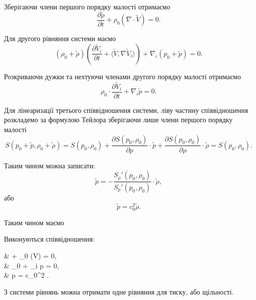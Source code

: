 Зберігаючи члени першого порядку малості отримаємо
\begin{equation}
	\frac{\partial \tilde \rho}{\partial t} + \rho_0 (\nabla \cdot \tilde V) = 0.
\end{equation}

Для другого рівняння системи маємо
\begin{equation}
	(\rho_0 + \tilde \rho) \left( \frac{\partial \tilde V_i}{\partial t} + \langle \tilde V, \nabla \tilde V_i \rangle \right) + \nabla_i (p_0 + \tilde p) = 0.
\end{equation}

Розкриваючи дужки та нехтуючи членами другого порядку малості отримаємо
\begin{equation}
	\rho_0 \cdot \frac{\partial \tilde V_i}{\partial t} + \nabla_i \tilde p = 0.
\end{equation}

Для лінеаризації третього співвідношення системи, ліву частину співвідношення розкладемо за формулою Тейлора зберігаючи лише члени першого порядку малості
\begin{equation}
	S(p_0 + \tilde p, \rho_0 + \tilde \rho) = S(p_0, \rho_0) + \frac{\partial S(p_0, \rho_0)}{\partial p} \cdot \tilde p + \frac{\partial S(p_0, \rho_0)}{\partial \rho} \cdot \tilde \rho = S(p_0, \rho_0).
\end{equation}

Таким чином можна записати:
\begin{equation}
	\tilde p = - \frac{S_\rho' (p_0, \rho_0)}{S_p'(p_0, \rho_0)} \cdot \tilde \rho,
\end{equation}
або
\begin{equation}
	\tilde p = c_0^2 \tilde \rho.
\end{equation}

Таким чином маємо
\begin{th_equation}
	Виконуються співвідношення:
	\begin{system}
		&  + \rho_0 (\nabla \cdot \tilde V) = 0, \\
		& \rho_0 \cdot {} + \nabla_i \tilde p = 0, \\
		& \tilde p = c_0^2 \tilde \rho.
	\end{system}
\end{th_equation}

З системи рівнянь можна отримати одне рівняння для тиску, або щільності. \medskip

